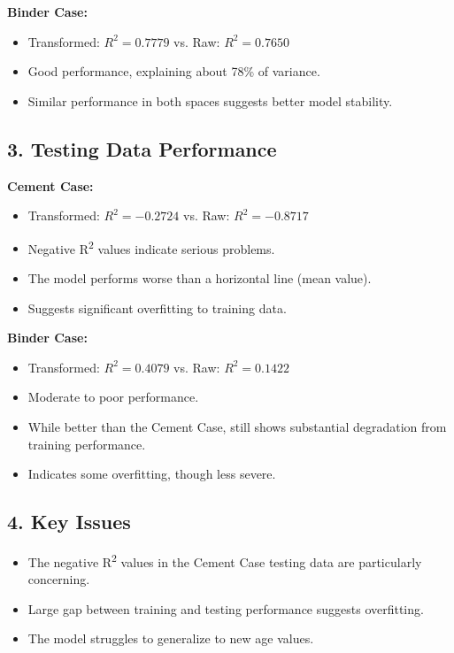 \documentclass[a4paper,11pt]{article}
\begin{document}
\textbf{Binder Case:}
\begin{itemize}
    \item Transformed: $R^2 = 0.7779$ vs. Raw: $R^2 = 0.7650$
    \item Good performance, explaining about 78\% of variance.
    \item Similar performance in both spaces suggests better model stability.
\end{itemize}

\subsection*{3. Testing Data Performance}
\textbf{Cement Case:}
\begin{itemize}
    \item Transformed: $R^2 = -0.2724$ vs. Raw: $R^2 = -0.8717$
    \item Negative R\textsuperscript{2} values indicate serious problems.
    \item The model performs worse than a horizontal line (mean value).
    \item Suggests significant overfitting to training data.
\end{itemize}

\textbf{Binder Case:}
\begin{itemize}
    \item Transformed: $R^2 = 0.4079$ vs. Raw: $R^2 = 0.1422$
    \item Moderate to poor performance.
    \item While better than the Cement Case, still shows substantial degradation from training performance.
    \item Indicates some overfitting, though less severe.
\end{itemize}

\subsection*{4. Key Issues}
\begin{itemize}
    \item The negative R\textsuperscript{2} values in the Cement Case testing data are particularly concerning.
    \item Large gap between training and testing performance suggests overfitting.
    \item The model struggles to generalize to new age values.
\end{itemize}
\end{document}
